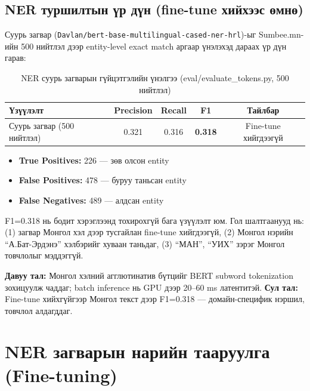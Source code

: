 \subsection{NER туршилтын үр дүн (fine-tune хийхээс өмнө)}

Суурь загвар (\texttt{Davlan/bert-base-multilingual-cased-ner-hrl})-ыг Sumbee.mn-ийн 500 нийтлэл дээр entity-level exact match аргаар үнэлэхэд дараах үр дүн гарав:

\begin{table}[h!]
\centering
\renewcommand{\arraystretch}{1.4}
\begin{tabular}{|l|c|c|c|c|}
\hline
\textbf{Үзүүлэлт} & \textbf{Precision} & \textbf{Recall} & \textbf{F1} & \textbf{Тайлбар} \\ \hline
Суурь загвар (500 нийтлэл) & 0.321 & 0.316 & \textbf{0.318} & Fine-tune хийгдээгүй \\ \hline
\end{tabular}
\caption{NER суурь загварын гүйцэтгэлийн үнэлгээ (eval/evaluate\_tokens.py, 500 нийтлэл)}
\label{tab:ner_results}
\end{table}

\begin{itemize}
    \item \textbf{True Positives:} 226 — зөв олсон entity
    \item \textbf{False Positives:} 478 — буруу таньсан entity
    \item \textbf{False Negatives:} 489 — алдсан entity
\end{itemize}

F1=0.318 нь бодит хэрэглээнд тохирохгүй бага үзүүлэлт юм. Гол шалтгаанууд нь: (1) загвар Монгол хэл дээр тусгайлан fine-tune хийгдээгүй, (2) Монгол нэрийн ``А.Бат-Эрдэнэ'' хэлбэрийг хуваан таньдаг, (3) ``МАН'', ``УИХ'' зэрэг Монгол товчлолыг мэддэггүй.

\textbf{Давуу тал:} Монгол хэлний агглютинатив бүтцийг BERT subword tokenization зохицуулж чаддаг; batch inference нь GPU дээр 20--60 ms латентитэй. \textbf{Сул тал:} Fine-tune хийхгүйгээр Монгол текст дээр F1=0.318 — домайн-специфик нэршил, товчлол алдагддаг.

\section{NER загварын нарийн тааруулга (Fine-tuning)}

